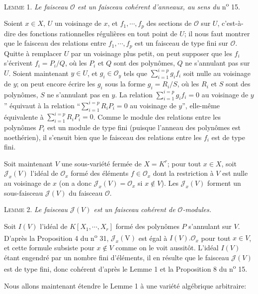 \textsc{Lemme} 1. \textit{Le faisceau $\mathcal{O}$ est un faisceau cohérent d'anneaux, au sens du} n\textsuperscript{o} 15.

Soient $x \in X$, $U$ un voisinage de $x$, et $f_1 , \cdots , f_p$ des sections de $\mathcal{O}$ sur $U$, c'est-à-dire des fonctions rationnelles régulières en tout point de $U$; il nous faut montrer que le faisceau des relations entre $f_1 , \cdots , f_p$ est un faisceau de type fini sur $\mathcal{O}$. Quitte à remplacer $U$ par un voisinage plus petit, on peut supposer que les $f_i$ s'écrivent $f_i = P_i/Q$, où les $P_i$ et $Q$ sont des polynômes, $Q$ ne s'annulant pas sur $U$. Soient maintenant $y \in U$, et $g_i \in \mathcal{O}_y$ tels que $\sum_{i=1}^{i=p} g_i f_i$ soit nulle au voisinage de $y$; on peut encore écrire les $g_i$ sous la forme $g_i = R_i/S$, où les $R_i$ et $S$ sont des polynômes, $S$ ne s'annulant pas en $y$. La relation $\sum_{i=1}^{i=p} g_i f_i = 0$ au voisinage de $y$'' équivaut à la relation ``$\sum_{i=1}^{i=p} R_i P_i = 0$ au voisinage de $y$'', elle-même équivalente à $\sum_{i=1}^{i=p} R_i P_i = 0$. Comme le module des relations entre les polynômes $P_i$ est un module de type fini (puisque l'anneau des polynômes est noethérien), il s'ensuit bien que le faisceau des relations entre les $f_i$ est de type fini.

Soit maintenant $V$ une sous-variété fermée de $X = K^r$; pour tout $x \in X$, soit $\mathcal{J}_x(V)$ l'idéal de $\mathcal{O}_x$ formé des éléments $f \in \mathcal{O}_x$ dont la restriction à $V$ est nulle au voisinage de $x$ (on a donc $\mathcal{J}_x(V) = \mathcal{O}_x$ si $x \notin V$). Les $\mathcal{J}_x(V)$ forment un sous-faisceau $\mathcal{J}(V)$ du faisceau $\mathcal{O}$.

\textsc{Lemme} 2. \textit{Le faisceau $\mathcal{J}(V)$ est un faisceau cohérent de $\mathcal{O}$-modules.}

Soit $I(V)$ l'idéal de $K[X_1, \cdots , X_r]$ formé des polynômes $P$ s'annulant sur $V$. D'après la Proposition 4 du n\textsuperscript{o} 31, $\mathcal{J}_x(\mathrm{V})$ est égal à $I(V).\mathcal{O}_x$ pour tout $x \in V$, et
cette formule subsiste pour $x \notin V$ comme on le voit aussitôt. L'idéal $I(V)$ étant engendré par un nombre fini d'éléments, il en résulte que le faisceau $\mathcal{J}(V)$ est de type fini, donc cohérent d'après le Lemme 1 et la Proposition 8 du n\textsuperscript{o} 15.

Nous allons maintenant étendre le Lemme 1 à une variété algébrique arbitraire:

